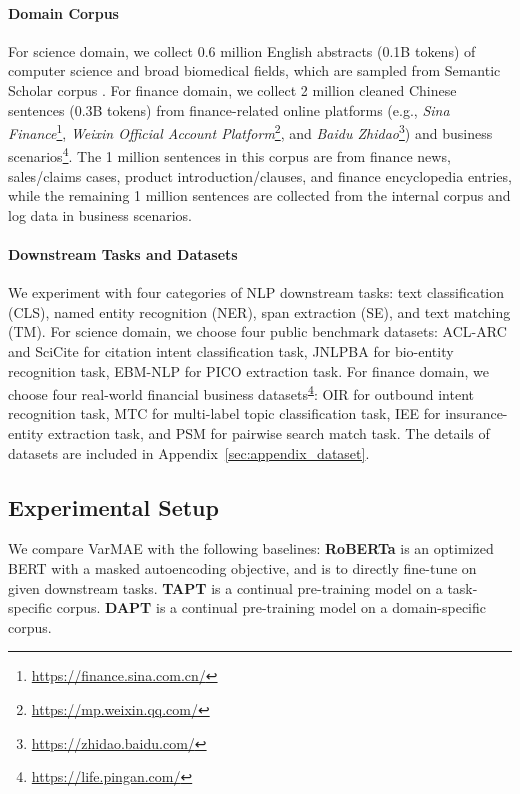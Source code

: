 \documentclass[11pt]{article}
\begin{document}
\paragraph{Domain Corpus}
For science domain,  we collect 0.6 million English abstracts (0.1B tokens) of computer science and broad biomedical fields, which are sampled from Semantic Scholar corpus \cite{DBLP:conf/naacl/AmmarGBBCDDEFHK18}.
For finance domain, we collect 2 million cleaned Chinese sentences (0.3B tokens) from finance-related online platforms (e.g., \textit{Sina Finance}\footnote{\url{https://finance.sina.com.cn/}}, \textit{Weixin Official Account Platform}\footnote{\url{https://mp.weixin.qq.com/}}, and \textit{Baidu Zhidao}\footnote{\url{https://zhidao.baidu.com/}}) 
and business scenarios\footnote{\url{https://life.pingan.com/}\label{code-life}}.
The 1 million sentences in this corpus are from finance news, sales/claims cases, product introduction/clauses, and finance encyclopedia entries, while the remaining 1 million sentences are collected from the internal corpus and log data in business scenarios.
\paragraph{Downstream Tasks and Datasets}
We experiment with four categories of NLP downstream tasks: text classification (CLS), named entity recognition (NER), span extraction (SE), and text matching (TM).
For science domain, we choose four public benchmark datasets: ACL-ARC \cite{DBLP:journals/tacl/JurgensKHMJ18} and SciCite \cite{DBLP:conf/naacl/CohanAZC19} for citation intent classification task, JNLPBA \cite{DBLP:conf/bionlp/CollierK04} for bio-entity recognition task, EBM-NLP \cite{DBLP:conf/acl/NenkovaLYMWNP18} for PICO extraction task.
For finance domain, we choose four real-world  financial business datasets\textsuperscript{\ref{code-life}}: OIR for outbound intent recognition task, MTC for multi-label topic classification task, IEE for insurance-entity extraction task, and PSM for pairwise search match task. 
The details of datasets are included in Appendix~\ref{sec:appendix_dataset}.





\subsection{Experimental Setup}
We compare VarMAE with the following baselines:
\textbf{RoBERTa} \cite{DBLP:journals/corr/abs-1907-11692}
is an optimized BERT with a masked autoencoding objective, and is to directly fine-tune on given downstream tasks.
\textbf{TAPT} \cite{DBLP:conf/acl/GururanganMSLBD20} is a continual pre-training model on a task-specific corpus.
\textbf{DAPT} \cite{DBLP:conf/acl/GururanganMSLBD20} is a continual pre-training model on a domain-specific corpus.
\end{document}
